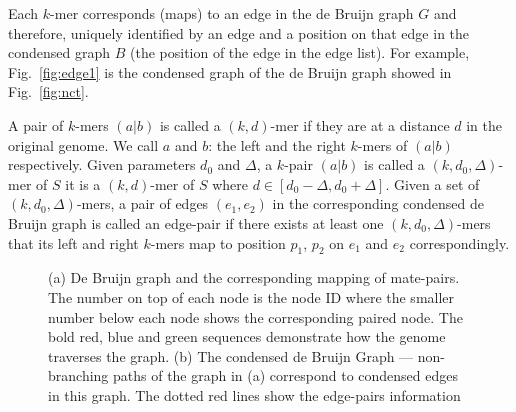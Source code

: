 \documentclass[12pt,a4paper,oneside]{article}
\begin{document}
Each $k$-mer corresponds (maps) to an edge in the de Bruijn graph $G$ and therefore, uniquely identified by an 
edge and a position on that edge in the condensed graph $B$ (the position of the edge in the edge list). For example, Fig.~\ref{fig:edge1} is 
the condensed graph of the de Bruijn graph showed in Fig.~\ref{fig:nct}. 

A pair of $k$-mers $(a|b)$ is called a $(k,d)$-mer if they are at a distance $d$  in the original genome. We call $a$ and $b$: the left 
and the right $k$-mers of $(a|b)$ respectively.
Given parameters $d_0$ and $\Delta$, a $k$-pair $(a|b)$  is called a $(k,d_0,\Delta)$-mer of $S$ 
it is a  $(k,d)$-mer of $S$ where $d \in [d_0-\Delta, d_0+ \Delta]$. 
Given a set of $(k,d_0,\Delta)$-mers,  a pair of edges $(e_1,e_2)$ in the corresponding condensed de Bruijn graph  is called an edge-pair if 
there exists at least one $(k,d_0,\Delta)$-mers that its left and right $k$-mers map to position $p_1$, $p_2$ on $e_1$ and $e_2$ correspondingly. 



\begin{figure}
    \begin{center}
    \caption{(a) De Bruijn graph and the corresponding mapping of mate-pairs. The number on top of each node is the node ID where the smaller number below each node 
shows the corresponding paired node. The bold red, blue and green sequences demonstrate how the genome traverses the graph.
(b) The condensed de Bruijn Graph --- non-branching paths of the graph in (a) correspond to condensed edges in this graph. The dotted red lines show
the edge-pairs information}
    \end{center}
\end{figure}
\end{document}
